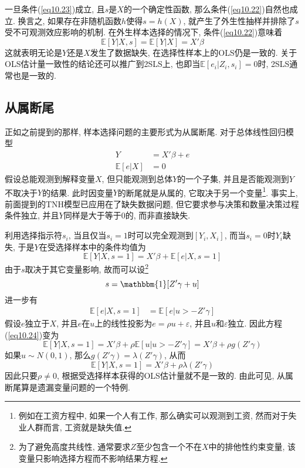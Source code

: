 \documentclass[cn, 12pt, math=mtpro2, bibstyle=apa, blue, twocol]{elegantbook}
\newcommand{\E}{\mathbb{E}}
\begin{document}
一旦条件(\ref{eq10.23})成立, 且$s$是$X$的一个确定性函数, 那么条件(\ref{eq10.22})自然也成立. 换言之, 如果存在非随机函数$h$使得$s=h(X)$, 就产生了外生性抽样并排除了$s$受不可观测效应影响的机制. 在外生样本选择的情况下, 条件(\ref{eq10.22})意味着
$$\E[Y|X,s]=\E[Y|X]=X'\beta$$
这就表明无论是$Y$还是$X$发生了数据缺失, 在选择性样本上的OLS仍是一致的. 关于OLS估计量一致性的结论还可以推广到2SLS上, 也即当$\E[e_i|Z_i,s_i]=0$时, 2SLS通常也是一致的.
\subsection{从属断尾}
正如之前提到的那样, 样本选择问题的主要形式为从属断尾. 对于总体线性回归模型
\begin{align*}
Y&=X'\beta+e \\
\E[e|X]&=0
\end{align*}
假设总能观测到解释变量$X$, 但只能观测到总体$Y$的一个子集, 并且是否能观测到$Y$不取决于$Y$的结果. 此时因变量$Y$的断尾就是从属的, 它取决于另一个变量\footnote{例如在工资方程中, 如果一个人有工作, 那么确实可以观测到工资, 然而对于失业人群而言, 工资就是缺失值.}. 事实上, 前面提到的TNH模型已应用在了缺失数据问题, 但它要求参与决策和数量决策过程条件独立, 并且$Y$同样是大于等于0的, 而非直接缺失.

利用选择指示符$s_i$, 当且仅当$s_i=1$时可以完全观测到$[Y_i,X_i]$, 而当$s_i=0$时$Y_i$缺失, 于是$Y$在受选择样本中的条件均值为
\begin{equation}\label{eq10.24}
  \E[Y|X,s=1]=X'\beta+\E[e|X,s=1]
\end{equation}
由于$s$取决于其它变量影响, 故而可以设\footnote{为了避免高度共线性, 通常要求$Z$至少包含一个不在$X$中的排他性约束变量, 该变量只影响选择方程而不影响结果方程.}
\begin{equation}\label{eq10.26}
  s=\mathbbm{1}[Z'\gamma+u]
\end{equation}
进一步有
\begin{align*}
\E[e|X,s=1]&=\E[e|u>-Z'\gamma]
\end{align*}
假设$e$独立于$X$, 并且$e$在$u$上的线性投影为$e=\rho u+\varepsilon$, 并且$u$和$\varepsilon$独立. 因此方程(\ref{eq10.24})变为
$$\E[Y|X,s=1]=X'\beta+\rho\E[u|u>-Z'\gamma]=X'\beta+\rho g(Z'\gamma)$$
如果$u\sim N(0,1)$, 那么$g(Z'\gamma)=\lambda(Z'\gamma)$, 从而
\begin{equation}\label{eq10.25}
  \E[Y|X,s=1]=X'\beta+\rho\lambda(Z'\gamma)
\end{equation}
因此只要$\rho\neq0$, 根据受选择样本获得的OLS估计量就不是一致的. 由此可见, 从属断尾算是遗漏变量问题的一个特例.
\end{document}
